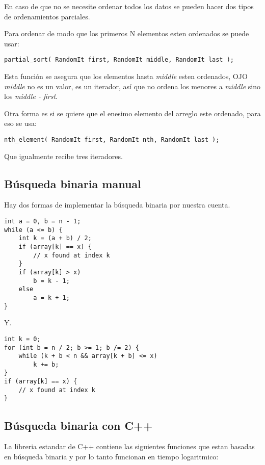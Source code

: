 \documentclass[10pt]{article}
\begin{document}
En caso de que no se necesite ordenar todos los datos se pueden hacer dos tipos de ordenamientos parciales.

Para ordenar de modo que los primeros N elementos esten ordenados se puede usar:

\begin{lstlisting}
partial_sort( RandomIt first, RandomIt middle, RandomIt last );
\end{lstlisting}

Esta función se asegura que los elementos hasta \textit{middle} esten ordenados, OJO \textit{middle} no es un valor, es un iterador, así que no ordena los menores a \textit{middle} sino los \textit{middle - first}.

Otra forma es si se quiere que el enesimo elemento del arreglo este ordenado, para eso se usa:

\begin{lstlisting}
nth_element( RandomIt first, RandomIt nth, RandomIt last );
\end{lstlisting}

Que igualmente recibe tres iteradores.

\subsection{Búsqueda binaria manual}

Hay dos formas de implementar la búsqueda binaria por nuestra cuenta.

\begin{lstlisting}
int a = 0, b = n - 1;
while (a <= b) {
    int k = (a + b) / 2;
    if (array[k] == x) {
        // x found at index k
    }
    if (array[k] > x)
        b = k - 1;
    else
        a = k + 1;
}
\end{lstlisting}

Y.

\begin{lstlisting}
int k = 0;
for (int b = n / 2; b >= 1; b /= 2) {
    while (k + b < n && array[k + b] <= x)
        k += b;
}
if (array[k] == x) {
    // x found at index k
}
\end{lstlisting}

\subsection{Búsqueda binaria con C++}

La libreria estandar de C++ contiene las siguientes funciones que estan basadas en búsqueda binaria y por lo tanto funcionan en tiempo logaritmico:
\end{document}
